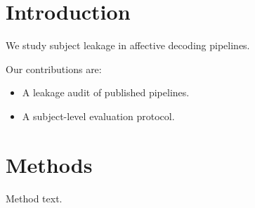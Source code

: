 \documentclass{article}
\begin{document}
\section{Introduction}
We study subject leakage in affective decoding pipelines.

Our contributions are:
\begin{itemize}
\item A leakage audit of published pipelines.
\item A subject-level evaluation protocol.
\end{itemize}
\section{Methods}
Method text.
\end{document}

